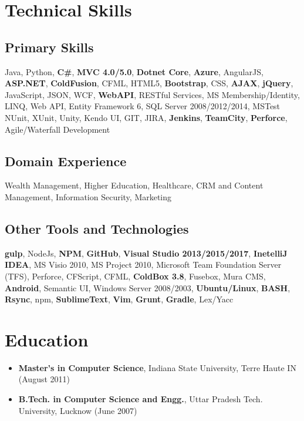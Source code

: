 \documentclass[letterpaper,10pt]{article}
\begin{document}
    \section{Technical Skills}
    \subsection{Primary Skills}
    Java, Python, \textbf{C\#}, \textbf{MVC 4.0/5.0}, \textbf{Dotnet Core}, \textbf{Azure}, AngularJS, \textbf{ASP.NET}, \textbf{ColdFusion}, CFML, HTML5, \textbf{Bootstrap}, CSS, \textbf{AJAX}, \textbf{jQuery}, JavaScript, JSON, WCF, \textbf{WebAPI}, RESTful Services, MS Membership/Identity, LINQ, Web API, Entity Framework 6, SQL Server 2008/2012/2014, MSTest NUnit, XUnit, Unity, Kendo UI, GIT, JIRA, \textbf{Jenkins}, \textbf{TeamCity}, \textbf{Perforce}, Agile/Waterfall Development

    \subsection{Domain Experience}
    Wealth Management, Higher Education, Healthcare, CRM and Content Management, Information Security, Marketing

    \subsection{Other Tools and Technologies}
    \textbf{gulp}, NodeJs, \textbf{NPM}, \textbf{GitHub}, \textbf{Visual Studio 2013/2015/2017}, \textbf{InetelliJ IDEA}, MS Visio 2010, MS Project 2010, Microsoft Team Foundation Server (TFS), Perforce, CFScript, CFML, \textbf{ColdBox 3.8}, Fusebox, Mura CMS, \textbf{Android}, Semantic UI, Windows Server 2008/2003, \textbf{Ubuntu/Linux}, \textbf{BASH}, \textbf{Rsync}, npm, \textbf{SublimeText}, \textbf{Vim}, \textbf{Grunt}, \textbf{Gradle}, Lex/Yacc

    \section{Education}
    \begin{itemize}
        \item \textbf{Master's in Computer Science}, Indiana State University, Terre Haute IN (August 2011)
        \item \textbf{B.Tech. in Computer Science and Engg.}, Uttar Pradesh Tech. University, Lucknow (June 2007)
    \end{itemize}
\end{document}
